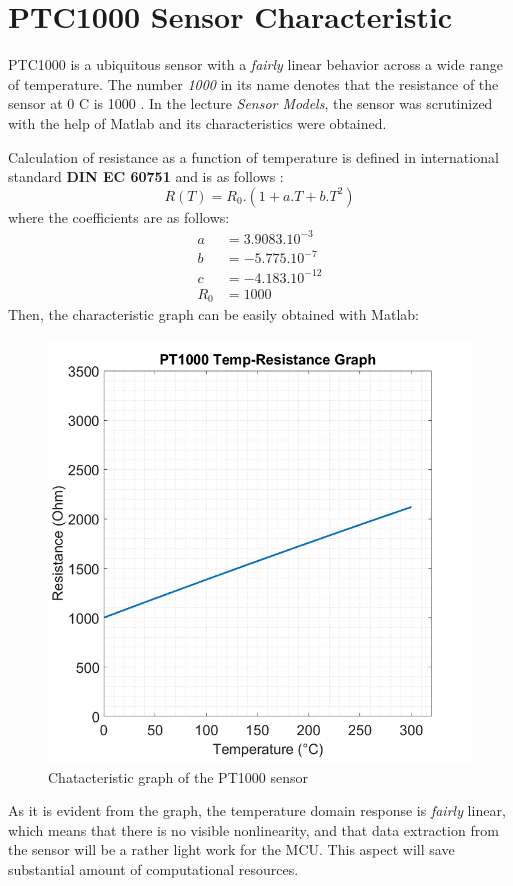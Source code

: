 \section*{PTC1000 Sensor Characteristic}

PTC1000 is a ubiquitous sensor with a \textit{fairly} linear behavior across a wide range of temperature. The number \textit{1000} in its name denotes that the resistance of the sensor at 0 \degree C is 1000 \ohm . In the lecture \textit{Sensor Models}, the sensor was scrutinized with the help of Matlab and its characteristics were obtained.

Calculation of resistance as a function of temperature is defined in international standard \textbf{DIN EC 60751} and is as follows \cite{Pt1000} \cite{DIN60751}:
\begin{equation}
    R(T) = R_0.(1 + a.T + b.T^2)
\end{equation}
where the coefficients are as follows:
\begin{align}
    a &= 3.9083.10^{-3}\\
    b &= -5.775.10^{-7}\\
    c &= -4.183.10^{-12}\\
    R_0 &= 1000
\end{align}
Then, the characteristic graph can be easily obtained with Matlab:

\begin{figure}[H]
    \centering
    \includegraphics[scale=0.45]{pics/tempresgraph}
    \caption{Chatacteristic graph of the PT1000 sensor}
\end{figure}
As it is evident from the graph, the temperature domain response is \textit{fairly} linear, which means that there is no visible nonlinearity, and that data extraction from the sensor will be a rather light work for the MCU. This aspect will save substantial amount of computational resources.

